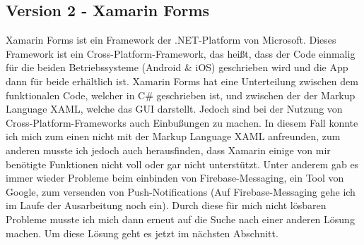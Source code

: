     \subsection{Version 2 - Xamarin Forms}
    Xamarin Forms ist ein Framework der .NET-Platform von Microsoft. Dieses Framework ist ein 
    Cross-Platform-Framework, das heißt, dass der Code einmalig für die beiden Betriebssysteme (Android \& iOS)
    geschrieben wird und die App dann für beide erhältlich ist.
    Xamarin Forms hat eine Unterteilung zwischen dem funktionalen Code, welcher in C\# geschrieben ist, und zwischen
    der der Markup Language XAML, welche das GUI darstellt\cite{Xamarin}.
    Jedoch sind bei der Nutzung von Cross-Platform-Frameworks auch Einbußungen zu machen. In diesem Fall konnte 
    ich mich zum einen nicht mit der Markup Language XAML anfreunden, zum anderen musste ich jedoch auch 
    herausfinden, dass Xamarin einige von mir benötigte Funktionen nicht voll oder gar nicht unterstützt. 
    Unter anderem gab es immer wieder Probleme beim einbinden von Firebase-Messaging, ein Tool von Google,
    zum versenden von Push-Notifications (Auf Firebase-Messaging gehe ich im Laufe der Ausarbeitung noch ein).
    Durch diese für mich nicht lösbaren Probleme musste ich mich dann erneut auf die Suche nach einer anderen
    Lösung machen. Um diese Lösung geht es jetzt im nächsten Abschnitt.
